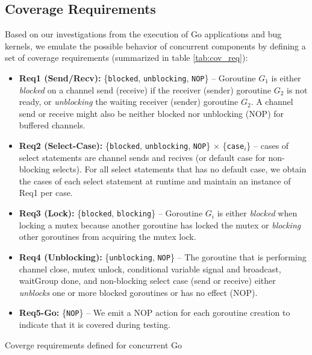 \subsection{Coverage Requirements}
\label{sec:ch4_covreq}
Based on our investigations from the execution of Go applications and bug kernels, we emulate the possible behavior of concurrent components by defining a set of coverage requirements (summarized in table \ref{tab:cov_req}):
%
\begin{itemize}
  \item \textbf{Req1 (Send/Recv):} \{\texttt{blocked}, \texttt{unblocking}, \texttt{NOP}\} -- Goroutine $G_1$ is either \textit{blocked} on a channel send (receive) if the receiver (sender) goroutine $G_2$ is not ready, or \textit{unblocking} the waiting receiver (sender) goroutine $G_2$. A channel send or receive might also be neither blocked nor unblocking (NOP) for buffered channels.
  \item \textbf{Req2 (Select-Case):} \{\texttt{blocked}, \texttt{unblocking}, \texttt{NOP}\} $\times$ \{\texttt{case}$_i$\} -- cases of select statements are channel sends and recives (or default case for non-blocking selects). For all select statements that has no default case, we obtain the cases of each select statement at runtime and maintain an instance of Req1 per case.
  \item \textbf{Req3 (Lock):} \{\texttt{blocked}, \texttt{blocking}\} -- Goroutine $G_i$ is either \textit{blocked} when locking a mutex because another goroutine has locked the mutex or \textit{blocking} other goroutines from acquiring the mutex lock.
  \item \textbf{Req4 (Unblocking):} \{\texttt{unblocking}, \texttt{NOP}\} -- The goroutine that is performing channel close, mutex unlock, conditional variable signal and broadcast, waitGroup done, and non-blocking select case (send or receive) either \textit{unblocks} one or more blocked goroutines or has no effect (NOP).
  \item \textbf{Req5-Go:} \{\texttt{NOP}\} -- We emit a NOP action for each goroutine creation to indicate that it is covered during testing.
\end{itemize}


\begin{table}[b]
\centering
\caption{Coverge requirements defined for concurrent Go}
\scalebox{0.83}{

}
\label{tab:cov_req}
\end{table}

